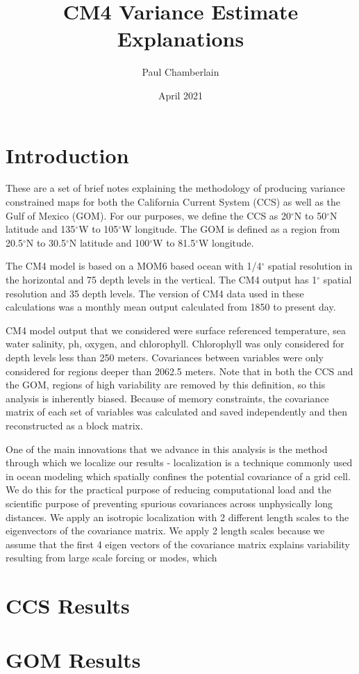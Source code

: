 \documentclass{article}
\title{CM4 Variance Estimate Explanations}
\author{Paul Chamberlain}
\date{April 2021}
\begin{document}
\maketitle

\section{Introduction}
These are a set of brief notes explaining the methodology of producing variance constrained maps for both the California Current System (CCS) as well as the Gulf of Mexico (GOM). For our purposes, we define the CCS as 20$^\circ$N to 50$^\circ$N latitude and 135$^\circ$W to 105$^\circ$W longitude. The GOM is defined as a region from 20.5$^\circ$N to 30.5$^\circ$N latitude and 100$^\circ$W to 81.5$^\circ$W longitude. 

The CM4 model \cite{held2019structure} is based on a MOM6 based ocean with 1/4$^\circ$ spatial resolution in the horizontal and 75 depth levels in the vertical. The CM4 output has 1$^\circ$ spatial resolution and 35 depth levels. The version of CM4 data used in these calculations was a monthly mean output calculated from 1850 to present day.

CM4 model output that we considered were surface referenced temperature, sea water salinity, ph, oxygen, and chlorophyll. Chlorophyll was only considered for depth levels less than 250 meters. Covariances between variables were only considered for regions deeper than 2062.5 meters. Note that in both the CCS and the GOM, regions of high variability are removed by this definition, so this analysis is inherently biased. Because of memory constraints, the covariance matrix of each set of variables was calculated and saved independently and then reconstructed as a block matrix. 

One of the main innovations that we advance in this analysis is the method through which we localize our results - localization is a technique commonly used in ocean modeling which spatially confines the potential covariance of a grid cell. We do this for the practical purpose of reducing computational load and the scientific purpose of preventing spurious covariances across unphysically long distances. We apply an isotropic localization \cite{gaspari1999construction} with 2 different length scales to the eigenvectors of the covariance matrix. We apply 2 length scales because we assume that the first 4 eigen vectors of the covariance matrix explains variability resulting from large scale forcing or modes, which 


\section{CCS Results}
\section{GOM Results}


\end{document}

